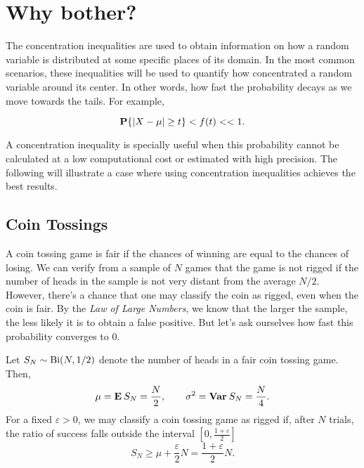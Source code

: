   


\vspace*{2em}

\section{Why bother?}

The concentration inequalities are used to obtain information on how a random variable is distributed at some specific places of its domain. In the most common scenarios, these inequalities will be used to quantify how concentrated a random variable around its center. In other words, how fast the probability decays as we move towards the tails. For example,

\[ \P\{|X-\mu| \geq t\} < f(t) << 1. \]

A concentration inequality is specially useful when this probability cannot be calculated at a low computational cost or estimated with high precision. The following  will illustrate a case where using concentration inequalities achieves the best results.

\subsection{Coin Tossings}

A coin tossing game is fair if the chances of winning are equal to the chances of losing. We can verify from a sample of $N$ games that the game is not rigged if the number of heads in the sample is not very distant from the average $N/2$. However, there's a chance that one may classify the coin as rigged, even when the coin is fair. By the \textit{Law of Large Numbers}, we know that the larger the sample, the less likely it is to obtain a false positive. But let's ask ourselves how fast this probability converges to 0.

\vspace*{1em}

Let $S_N \sim \Bi(N,1/2)$ denote the number of heads in a fair coin tossing game. Then,
\[ \mu = \E S_N = \frac{N}{2}, \hspace*{2em} \sigma^2 = \Var S_N = \frac{N}{4}. \] 
For a fixed $\varepsilon > 0$, we may classify a coin tossing game as rigged if, after $N$ trials, the ratio of success falls outside the interval $[0, \tfrac{1+\varepsilon}{2}]$
\[ S_N \geq \mu +  \frac{\varepsilon}{2} N = \frac{1+\varepsilon}{2} N. \]

